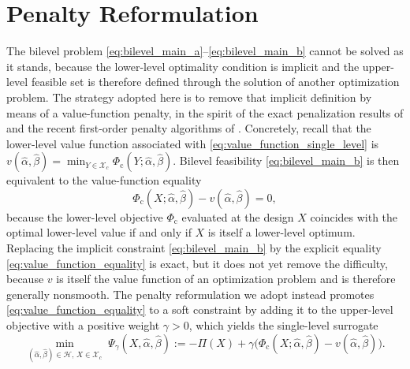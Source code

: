 \section{Penalty Reformulation}
\label{sec:penalty_reformulation}
The bilevel problem \eqref{eq:bilevel_main_a}--\eqref{eq:bilevel_main_b} cannot be solved as it stands, because the lower-level optimality condition is implicit and the upper-level feasible set is therefore defined through the solution of another optimization problem. The strategy adopted here is to remove that implicit definition by means of a value-function penalty, in the spirit of the exact penalization results of \cite{Ye1997Exact} and the recent first-order penalty algorithms of \cite{LuMei2024,Jiang2024Primal}. Concretely, recall that the lower-level value function associated with \eqref{eq:value_function_single_level} is $v(\widehat{\alpha},\widehat{\beta})=\min_{Y\in\mathcal{X}_c}\Phi_{\mathrm{c}}(Y;\widehat{\alpha},\widehat{\beta})$. Bilevel feasibility \eqref{eq:bilevel_main_b} is then equivalent to the value-function equality
\begin{equation}
\Phi_{\mathrm{c}}(X;\widehat{\alpha},\widehat{\beta})-v(\widehat{\alpha},\widehat{\beta})=0,
\label{eq:value_function_equality}
\end{equation}
because the lower-level objective $\Phi_{\mathrm{c}}$ evaluated at the design $X$ coincides with the optimal lower-level value if and only if $X$ is itself a lower-level optimum. Replacing the implicit constraint \eqref{eq:bilevel_main_b} by the explicit equality \eqref{eq:value_function_equality} is exact, but it does not yet remove the difficulty, because $v$ is itself the value function of an optimization problem and is therefore generally nonsmooth. The penalty reformulation we adopt instead promotes \eqref{eq:value_function_equality} to a soft constraint by adding it to the upper-level objective with a positive weight $\gamma>0$, which yields the single-level surrogate
\begin{equation}
\min_{(\widehat{\alpha},\widehat{\beta})\in\mathcal{H},\,X\in\mathcal{X}_c}\;
\Psi_{\gamma}(X,\widehat{\alpha},\widehat{\beta}):=
-\Pi(X)+\gamma\bigl(\Phi_{\mathrm{c}}(X;\widehat{\alpha},\widehat{\beta})-v(\widehat{\alpha},\widehat{\beta})\bigr).
\label{eq:penalized_bilevel_problem}
\end{equation}
